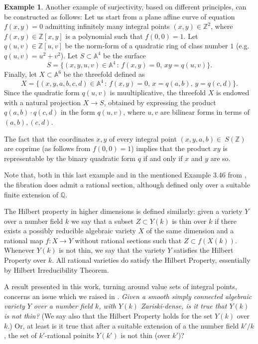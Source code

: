 \documentclass[leqno,12pt]{article} %
\def\A{{{\mathbb A}}}
\def\Z{{{\mathbb Z}}}
\def\Q{{{\mathbb Q}}}
\theoremstyle{plain} %
\theoremstyle{definition} %
\newtheorem{example}[theorem]{\indent\sc Example}
\begin{document}
  
\smallskip

\begin{example}\label{ex.new}
Another example of surjectivity, based on different principles, can be constructed as follows: Let us start from a plane affine curve of equation $f(x,y)=0$ admitting infinitely many integral points $(x,y)\in\Z^2$, where $f(x,y)\in\Z[x,y]$ is a polynomial such that $f(0,0)=1$.
Let $q(u,v)\in\Z[u,v]$ be the norm-form of a  quadratic ring of class number $1$ (e.g. $q(u,v)=u^2+v^2$). Let $S\subset \A^4$ be the surface
$$
S=\{(x,y,u,v)\in \A^4\, :\, f(x,y)=0,\, xy=q(u,v)\}.
$$
Finally, let $X\subset\A^6$ be the threefold defined as
$$
X=\{ (x,y,a,b,c,d)\in\A^4\, :\, f(x,y)=0,\, x=q(a,b),\, y=q(c,d)\}.
$$
Since the quadratic form $q(u,v)$ is muultiplicative, the threefold $X$ is endowed with a natural projection $X\to S$, obtained by expressing the product $q(a,b)\cdot q(c,d)$ in the form $q(u,v)$, where $u,v$ are bilinear forms in terms of $(a,b),(c,d)$. 

The fact that the coordinates $x,y$ of every integral point $(x,y,a,b)\in\ S(\Z)$  are coprime (as follows from $f(0,0)=1$) implies that the product $xy$ is representable by the binary quadratic form $q$  if and only if $x$ and $y$ are so.

\smallskip

Note that, both in this last example and in the mentioned Example 3.46 from \cite{CZ-libro}, the fibration  does admit a rational section,  although defined only over a suitable finite extension of $\Q$.
\end{example}




The Hilbert property in higher dimensions is defined similarly: given a variety $Y$ over a number field $k$ we say that a subset $Z\subset Y(k)$ is thin over $k$ if there exists a possibly reducible algebraic variety $X$ of the same dimension and a rational map $f: X\to Y$ without rational sections such that $Z\subset f(X(k))$. Whenever $Y(k)$ is not thin, we say that the variety $Y$ satisfies 
the Hilbert Property over $k$. All rational varieties do satisfy the Hilbert Property, essentially by Hilbert Irreducibility Theorem.

\medskip






A result presented in this work, turning around value sets of integral points,  concerns an issue which we raised in \cite{CZhilb}. {\it Given a smooth simply connected algebraic variety $Y$ over a number field $k$, with $Y(k)$ Zariski-dense, is it true that $Y(k)$ is not thin?} (We say also that the Hilbert Property holds for the set $Y(k)$ over $k$.) Or, at least is it true that after   a suitable extension of a the number field $k'/k$, the set of $k'$-rational poinits $Y(k')$ is not thin (over $k'$)?  
\end{document}
